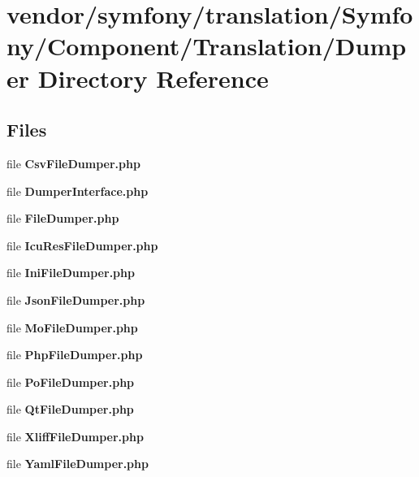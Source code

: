 \section{vendor/symfony/translation/\+Symfony/\+Component/\+Translation/\+Dumper Directory Reference}
\label{dir_46833a04046e17ab1b77abdc4326240b}
\subsection*{Files}
\begin{DoxyCompactItemize}
\item 
file {\bf Csv\+File\+Dumper.\+php}
\item 
file {\bf Dumper\+Interface.\+php}
\item 
file {\bf File\+Dumper.\+php}
\item 
file {\bf Icu\+Res\+File\+Dumper.\+php}
\item 
file {\bf Ini\+File\+Dumper.\+php}
\item 
file {\bf Json\+File\+Dumper.\+php}
\item 
file {\bf Mo\+File\+Dumper.\+php}
\item 
file {\bf Php\+File\+Dumper.\+php}
\item 
file {\bf Po\+File\+Dumper.\+php}
\item 
file {\bf Qt\+File\+Dumper.\+php}
\item 
file {\bf Xliff\+File\+Dumper.\+php}
\item 
file {\bf Yaml\+File\+Dumper.\+php}
\end{DoxyCompactItemize}
